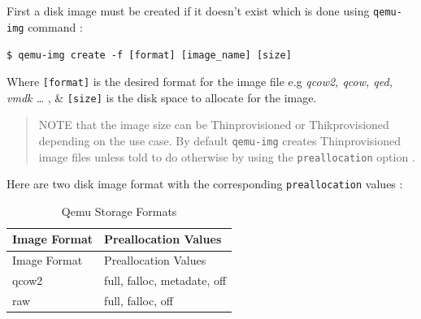 \documentclass[
  14pt,
  english,
  a4paper,
]{scrreprt}
\begin{document}
First a disk image must be created if it doesn't exist which is done
using \texttt{qemu-img} command :

\texttt{\$\ qemu-img\ create\ -f\ {[}format{]}\ {[}image\_name{]}\ {[}size{]}}

Where \texttt{{[}format{]}} is the desired format for the image file e.g
\emph{qcow2, qcow, qed, vmdk \ldots{}} , \& \texttt{{[}size{]}} is the
disk space to allocate for the image.

\begin{quote}
NOTE that the image size can be Thinprovisioned or Thikprovisioned
depending on the use case. By default \texttt{qemu-img} creates
Thinprovisioned image files unless told to do otherwise by using the
\texttt{preallocation} option .
\end{quote}

Here are two disk image format with the corresponding
\texttt{preallocation} values :

\hypertarget{tbl:qemu_sto_fmt}{}
\begin{longtable}[]{@{}ll@{}}
\caption{\label{tbl:qemu_sto_fmt}Qemu Storage Formats}\tabularnewline
\toprule
\begin{minipage}[b]{0.20\columnwidth}\raggedright
Image Format\strut
\end{minipage} & \begin{minipage}[b]{0.39\columnwidth}\raggedright
Preallocation Values\strut
\end{minipage}\tabularnewline
\midrule
\endfirsthead
\toprule
\begin{minipage}[b]{0.20\columnwidth}\raggedright
Image Format\strut
\end{minipage} & \begin{minipage}[b]{0.39\columnwidth}\raggedright
Preallocation Values\strut
\end{minipage}\tabularnewline
\midrule
\endhead
\begin{minipage}[t]{0.20\columnwidth}\raggedright
qcow2\strut
\end{minipage} & \begin{minipage}[t]{0.39\columnwidth}\raggedright
full, falloc, metadate, off\strut
\end{minipage}\tabularnewline
\begin{minipage}[t]{0.20\columnwidth}\raggedright
raw\strut
\end{minipage} & \begin{minipage}[t]{0.39\columnwidth}\raggedright
full, falloc, off\strut
\end{minipage}\tabularnewline
\bottomrule
\end{longtable}
\end{document}

